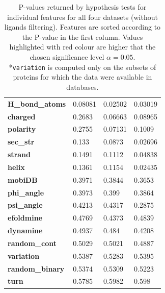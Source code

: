 \begin{table}[]
\begin{tabular}{llll}
\textbf{H\_bond\_atoms}       & \cellcolor[HTML]{F54D4D}0.08081 & 0.02502                         & 0.03019                         \\
\textbf{charged}              & \cellcolor[HTML]{F54D4D}0.2683  & \cellcolor[HTML]{F54D4D}0.06663 & \cellcolor[HTML]{F54D4D}0.08965 \\
\textbf{polarity}             & \cellcolor[HTML]{F54D4D}0.2755  & \cellcolor[HTML]{F54D4D}0.07131 & \cellcolor[HTML]{F54D4D}0.1009  \\
\textbf{sec\_str}             & \cellcolor[HTML]{F54D4D}0.133   & \cellcolor[HTML]{F54D4D}0.0873  & 0.02696                         \\
\textbf{strand}               & \cellcolor[HTML]{F54D4D}0.1491  & \cellcolor[HTML]{F54D4D}0.1112  & 0.04838                         \\
\textbf{helix}                & \cellcolor[HTML]{F54D4D}0.1361  & \cellcolor[HTML]{F54D4D}0.1154  & 0.02435                         \\
\textbf{mobiDB}               & \cellcolor[HTML]{F54D4D}0.3971  & \cellcolor[HTML]{F54D4D}0.3844  & \cellcolor[HTML]{F54D4D}0.3653  \\
\textbf{phi\_angle}           & \cellcolor[HTML]{F54D4D}0.3973  & \cellcolor[HTML]{F54D4D}0.399   & \cellcolor[HTML]{F54D4D}0.3864  \\
\textbf{psi\_angle}           & \cellcolor[HTML]{F54D4D}0.4213  & \cellcolor[HTML]{F54D4D}0.4317  & \cellcolor[HTML]{F54D4D}0.2875  \\
\textbf{efoldmine}            & \cellcolor[HTML]{F54D4D}0.4769  & \cellcolor[HTML]{F54D4D}0.4373  & \cellcolor[HTML]{F54D4D}0.4839  \\
\textbf{dynamine}             & \cellcolor[HTML]{F54D4D}0.4937  & \cellcolor[HTML]{F54D4D}0.484   & \cellcolor[HTML]{F54D4D}0.4208  \\
\textbf{random\_cont}         & \cellcolor[HTML]{F54D4D}0.5029  & \cellcolor[HTML]{F54D4D}0.5021  & \cellcolor[HTML]{F54D4D}0.4887  \\
\textbf{variation}            & \cellcolor[HTML]{F54D4D}0.5387  & \cellcolor[HTML]{F54D4D}0.5283  & \cellcolor[HTML]{F54D4D}0.5395  \\
\textbf{random\_binary}       & \cellcolor[HTML]{F54D4D}0.5374  & \cellcolor[HTML]{F54D4D}0.5309  & \cellcolor[HTML]{F54D4D}0.5223  \\
\textbf{turn}                 & \cellcolor[HTML]{F54D4D}0.5785  & \cellcolor[HTML]{F54D4D}0.5982  & \cellcolor[HTML]{F54D4D}0.598   \\ \hline
\end{tabular}
\caption{P-values returned by hypothesis tests for individual features for all four datasets (without ligands filtering). Features are sorted according to the P-value in the first column. Values highlighted with red colour are higher that the chosen significance level $\alpha = 0.05$.\\\hspace{\textwidth}
*\texttt{variation} is computed only on the subsets of proteins for which the data were available in databases.}
\label{tab:pvalues500}
\end{table}





